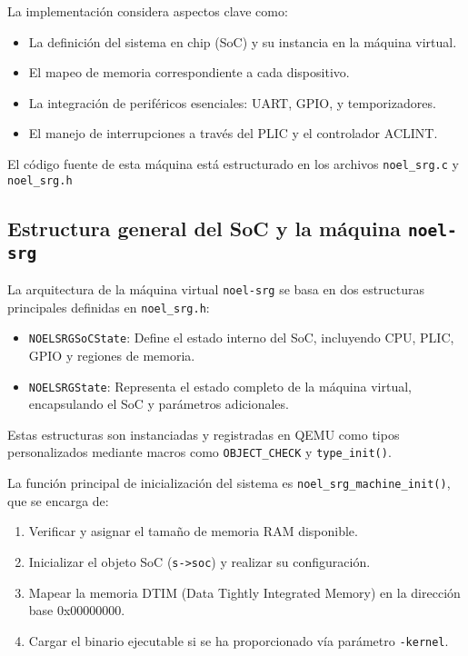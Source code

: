 La implementación considera aspectos clave como:
\begin{itemize}
    \item La definición del sistema en chip (SoC) y su instancia en la máquina virtual.
    \item El mapeo de memoria correspondiente a cada dispositivo.
    \item La integración de periféricos esenciales: UART, GPIO, y temporizadores.
    \item El manejo de interrupciones a través del PLIC y el controlador ACLINT.
\end{itemize}

El código fuente de esta máquina está estructurado en los archivos \texttt{noel\_srg.c} y \texttt{noel\_srg.h}

\subsection{Estructura general del SoC y la máquina \texttt{noel-srg}}
\label{subsec:estructura-noel}

La arquitectura de la máquina virtual \texttt{noel-srg} se basa en dos estructuras principales definidas en \texttt{noel\_srg.h}:

\begin{itemize}
    \item \texttt{NOELSRGSoCState}: Define el estado interno del SoC, incluyendo CPU, PLIC, GPIO y regiones de memoria.
    \item \texttt{NOELSRGState}: Representa el estado completo de la máquina virtual, encapsulando el SoC y parámetros adicionales.
\end{itemize}

Estas estructuras son instanciadas y registradas en QEMU como tipos personalizados mediante macros como \texttt{OBJECT\_CHECK} y \texttt{type\_init()}.

La función principal de inicialización del sistema es \texttt{noel\_srg\_machine\_init()}, que se encarga de:

\begin{enumerate}
    \item Verificar y asignar el tamaño de memoria RAM disponible.
    \item Inicializar el objeto SoC (\texttt{s->soc}) y realizar su configuración.
    \item Mapear la memoria DTIM (Data Tightly Integrated Memory) en la dirección base 0x00000000.
    \item Cargar el binario ejecutable si se ha proporcionado vía parámetro \texttt{-kernel}.
\end{enumerate}

